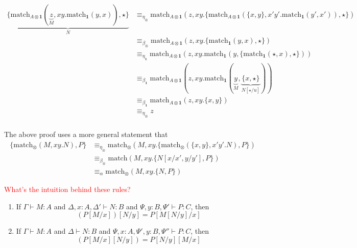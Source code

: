 \documentclass[acmsmall,screen, nonacm, anonymous]{acmart}
\begin{document}
\begin{itemize}
\begin{align*}
  \underbrace{\{\text{match}_{A \otimes \mathbf{1}}(\underbrace{z}_{M}, xy.\text{match}_{\mathbf{1}}(y,x)), \star\}}_{N} &\equiv_{\eta_{\otimes}} \text{match}_{A \otimes \mathbf{1}}(z, xy.\{\text{match}_{A \otimes \mathbf{1}}(\{x,y\}, x'y'.\text{match}_{\mathbf{1}}(y',x')), \star\})\\ 
  &\equiv_{\beta_{\otimes}} \text{match}_{A \otimes \mathbf{1}}(z,xy.\{{\text{match}_{\mathbf{1}}(y,x), \star}\})\\
  &\equiv_{\eta_{\mathbf{1}}}\text{match}_{A \otimes \mathbf{1}}(z, xy.\text{match}_{\mathbf{1}}(y,\{\text{match}_{\mathbf{1}}(\star,x), \star\}))\\
  &\equiv_{\beta_{\mathbf{1}}} \text{match}_{A \otimes \mathbf{1}}(z, xy.\text{match}_{\mathbf{1}}(\underbrace{y}_{M},\underbrace{\{x, \star\}}_{N[\star / u]}))\\
  &\equiv_{\beta_{\mathbf{1}}} \text{match}_{A \otimes \mathbf{1}}(z, xy.\{x, y\})\\
  &\equiv_{\eta_{\otimes}} z\\
\end{align*}
  
The above proof uses a more general statement that 
\begin{align*}
\{\text{match}_{\otimes}(M, xy.N), P\} &\equiv_{\eta_{\otimes}} \text{match}_{\otimes}(M,xy.\{\text{match}_{\otimes}(\{x,y\}, x'y'.N), P\})\\
&\equiv_{\beta_{\otimes}} \text{match}(M,xy.\{N[x/x',y/y'], P\})\\
&\equiv_{\alpha} \text{match}_{\otimes}(M,xy.\{N,P\})
\end{align*}

\textcolor{red}{What's the intuition behind these rules?}

\end{itemize}

\begin{lemma}

  \begin{enumerate}
  \item If $\Gamma \vdash M : A$ and $\Delta, x : A, \Delta' \vdash N : B$ and $\Psi, y : B, \Psi' \vdash P : C$, then
  \[
  (P[M/x])[N/y] = P[M[N/y]/x]
  \]
  \item If $\Gamma \vdash M : A$ and $\Delta \vdash N : B$ and $\Psi, x : A, \Psi', y : B, \Psi'' \vdash P : C$, then
  \[
  (P[M/x][N/y]) = P[N/y][M/x]
  \]
  \end{enumerate}
\end{lemma}
\end{document}
